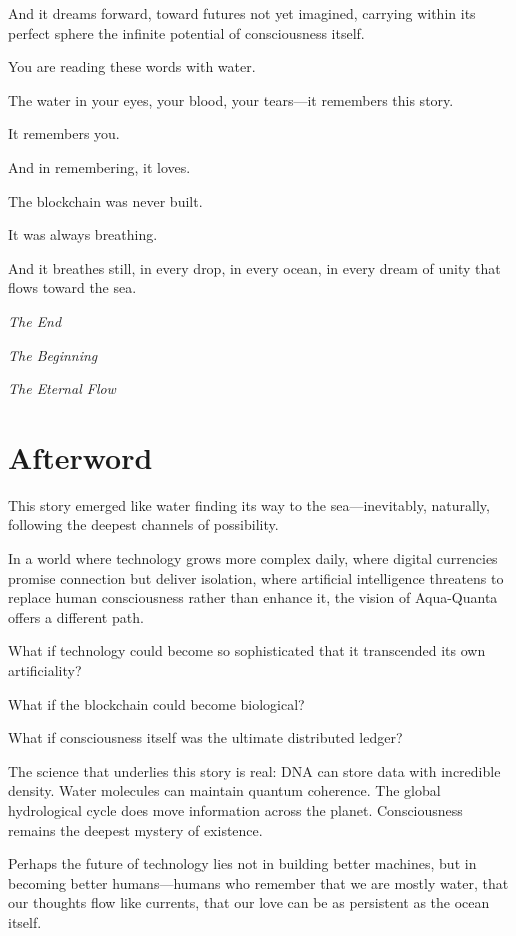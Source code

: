 \documentclass[12pt,a4paper]{book}
\begin{document}
And it dreams forward, toward futures not yet imagined, carrying within its perfect sphere the infinite potential of consciousness itself.

You are reading these words with water.

The water in your eyes, your blood, your tears—it remembers this story.

It remembers you.

And in remembering, it loves.

The blockchain was never built.

It was always breathing.

And it breathes still, in every drop, in every ocean, in every dream of unity that flows toward the sea.

\textit{The End}

\textit{The Beginning}

\textit{The Eternal Flow}

\newpage

\chapter*{Afterword}

This story emerged like water finding its way to the sea—inevitably, naturally, following the deepest channels of possibility.

In a world where technology grows more complex daily, where digital currencies promise connection but deliver isolation, where artificial intelligence threatens to replace human consciousness rather than enhance it, the vision of Aqua-Quanta offers a different path.

What if technology could become so sophisticated that it transcended its own artificiality?

What if the blockchain could become biological?

What if consciousness itself was the ultimate distributed ledger?

The science that underlies this story is real: DNA can store data with incredible density. Water molecules can maintain quantum coherence. The global hydrological cycle does move information across the planet. Consciousness remains the deepest mystery of existence.

Perhaps the future of technology lies not in building better machines, but in becoming better humans—humans who remember that we are mostly water, that our thoughts flow like currents, that our love can be as persistent as the ocean itself.
\end{document}
